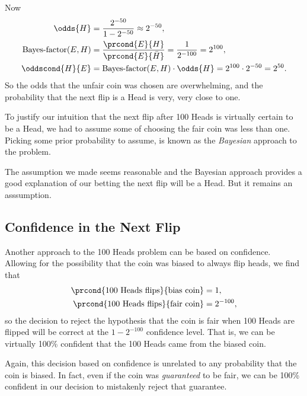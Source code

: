 Now
\begin{align*}
\odds{H} & = \frac{2^{-50}}{1-2^{-50}} \approx 2^{-50},\\
\BF{E}{H} & = \frac{\prcond{E}{H}}{\prcond{E}{\bar{H}}} = \frac{1}{2^{-100}} = 2^{100},\\
\oddscond{H}{E} & = \BF{E}{H} \cdot \odds{H} = 2^{100} \cdot 2^{-50} = 2^{50}.
\end{align*}
So the odds that the unfair coin was chosen are overwhelming, and the
probability that the next flip is a Head is very, very close to one.

To justify our intuition that the next flip after 100 Heads is
virtually certain to be a Head, we had to assume some  of choosing the fair coin was less than one.  Picking
some prior probability to assume, is known as the \emph{Bayesian}
approach to the problem.

The assumption we made seems reasonable and the Bayesian approach
provides a good explanation of our betting the next flip will be a
Head.  But it remains an asssumption.

\subsection{Confidence in the Next Flip}

Another approach to the 100 Heads problem can be based on confidence.
Allowing for the possibility that the coin was biased to always flip
heads, we find that
\begin{align*}
\prcond{\text{100 Heads flips}}{\text{bias coin}} & = 1,\\
\prcond{\text{100 Heads flips}}{\text{fair coin}} & = 2^{-100},
\end{align*}
so the decision to reject the hypothesis that the coin is fair when
100 Heads are flipped will be correct at the $1-2^{-100}$ confidence
level.  That is, we can be virtually 100\% confident that the 100
Heads came from the biased coin.

Again, this decision based on confidence is unrelated to any
probability that the coin is biased.  In fact, even if the coin was
\emph{guaranteed} to be fair, we can be 100\% confident in our
decision to mistakenly reject that guarantee.

\endinput

